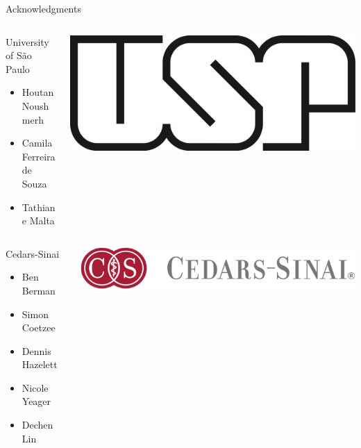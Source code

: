 \documentclass[slidestop,compress,11pt,xcolor=dvipsnames]{beamer}
\begin{document}
\begin{frame}{Acknowledgments}
 \begin{columns}[T]
  \begin{column}{0.5\textwidth}
   \begin{block}{University of São Paulo}
    \begin{itemize}
      \item  Houtan Noushmerh
      \item  Camila Ferreira de Souza
      \item  Tathiane Malta
    \end{itemize}
   \end{block}
  \end{column}
  \begin{column}{0.5\textwidth}
   \vspace{0.9cm}
   \includegraphics[width=0.4\linewidth]{logo/usp.png}
  \end{column}
 \end{columns}

 \vspace{0.2cm}
 \begin{columns}[T]
  \begin{column}{0.5\textwidth}
   \begin{block}{Cedars-Sinai}
    \begin{itemize}
     \item Ben Berman
     \item Simon Coetzee
     \item Dennis Hazelett
     \item Nicole Yeager
     \item Dechen Lin
    \end{itemize}
   \end{block}
  \end{column}
  \begin{column}{0.5\textwidth}
   \vspace{1.5cm}
   \includegraphics[width=1.0\linewidth]{cedars.png}
  \end{column}
 \end{columns}

\end{frame}
\end{document}
